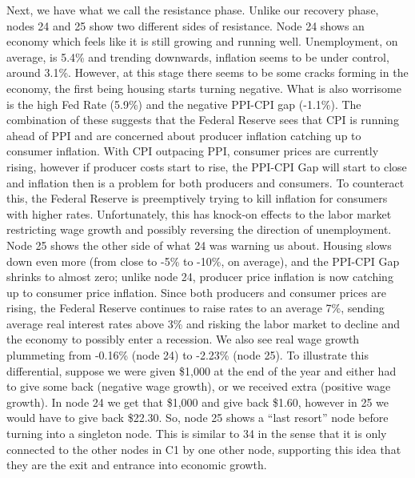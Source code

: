 \documentclass[
  10pt,
  letterpaper,
  DIV=11,
  numbers=noendperiod]{scrartcl}
\begin{document}
Next, we have what we call the resistance phase. Unlike our recovery
phase, nodes 24 and 25 show two different sides of resistance. Node 24
shows an economy which feels like it is still growing and running well.
Unemployment, on average, is 5.4\% and trending downwards, inflation
seems to be under control, around 3.1\%. However, at this stage there
seems to be some cracks forming in the economy, the first being housing
starts turning negative. What is also worrisome is the high Fed Rate
(5.9\%) and the negative PPI-CPI gap (-1.1\%). The combination of these
suggests that the Federal Reserve sees that CPI is running ahead of PPI
and are concerned about producer inflation catching up to consumer
inflation. With CPI outpacing PPI, consumer prices are currently rising,
however if producer costs start to rise, the PPI-CPI Gap will start to
close and inflation then is a problem for both producers and consumers.
To counteract this, the Federal Reserve is preemptively trying to kill
inflation for consumers with higher rates. Unfortunately, this has
knock-on effects to the labor market restricting wage growth and
possibly reversing the direction of unemployment. Node 25 shows the
other side of what 24 was warning us about. Housing slows down even more
(from close to -5\% to -10\%, on average), and the PPI-CPI Gap shrinks
to almost zero; unlike node 24, producer price inflation is now catching
up to consumer price inflation. Since both producers and consumer prices
are rising, the Federal Reserve continues to raise rates to an average
7\%, sending average real interest rates above 3\% and risking the labor
market to decline and the economy to possibly enter a recession. We also
see real wage growth plummeting from -0.16\% (node 24) to -2.23\% (node
25). To illustrate this differential, suppose we were given \$1,000 at
the end of the year and either had to give some back (negative wage
growth), or we received extra (positive wage growth). In node 24 we get
that \$1,000 and give back \$1.60, however in 25 we would have to give
back \$22.30. So, node 25 shows a ``last resort'' node before turning
into a singleton node. This is similar to 34 in the sense that it is
only connected to the other nodes in C1 by one other node, supporting
this idea that they are the exit and entrance into economic growth.
\end{document}
